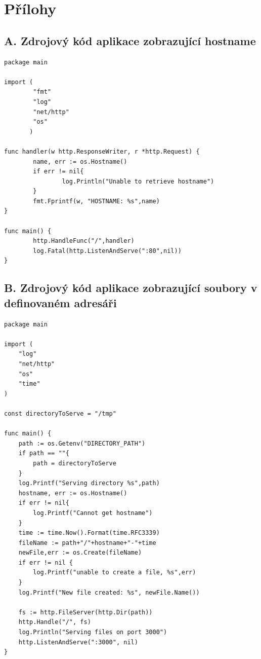 \appendix
{}
\chapter*{Přílohy}

\section*{A. Zdrojový kód aplikace zobrazující hostname\label{app:hostname}}
\begin{verbatim}
package main

import (
        "fmt"
        "log"
        "net/http"
        "os"
       )

func handler(w http.ResponseWriter, r *http.Request) {
        name, err := os.Hostname()
        if err != nil{
                log.Println("Unable to retrieve hostname")
        }
        fmt.Fprintf(w, "HOSTNAME: %s",name)
}

func main() {
        http.HandleFunc("/",handler)
        log.Fatal(http.ListenAndServe(":80",nil))
}
\end{verbatim}


\clearpage
\section*{B. Zdrojový kód aplikace zobrazující soubory v definovaném adresáři\label{app:servefiles}}
\begin{verbatim}
package main

import (
	"log"
	"net/http"
	"os"
	"time"
)

const directoryToServe = "/tmp"

func main() {
	path := os.Getenv("DIRECTORY_PATH")
	if path == ""{
		path = directoryToServe
	}
	log.Printf("Serving directory %s",path)
	hostname, err := os.Hostname()
	if err != nil{
		log.Printf("Cannot get hostname")
	}
	time := time.Now().Format(time.RFC3339)
	fileName := path+"/"+hostname+"-"+time
	newFile,err := os.Create(fileName)
	if err != nil {
		log.Printf("unable to create a file, %s",err)
	}
	log.Printf("New file created: %s", newFile.Name())

	fs := http.FileServer(http.Dir(path))
	http.Handle("/", fs)
	log.Println("Serving files on port 3000")
	http.ListenAndServe(":3000", nil)
}
\end{verbatim}


\clearpage
